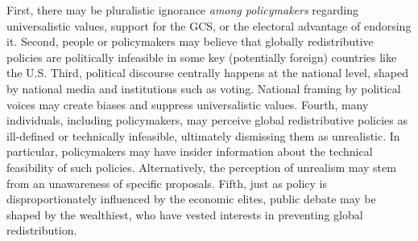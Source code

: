 First, there may be pluralistic ignorance \textit{among policymakers} regarding universalistic values, support for the GCS, or the electoral advantage of endorsing it. Second, people or policymakers may believe that globally redistributive policies are politically infeasible in some key (potentially foreign) countries like the U.S. %
Third, political discourse centrally happens at the national level, shaped by national media and institutions such as voting. 
National framing by political voices may create biases and suppress universalistic values. %
Fourth, many individuals, including policymakers, may perceive global redistributive policies as ill-defined or technically infeasible, ultimately dismissing them as unrealistic. In particular, policymakers may have insider information about the technical feasibility of such policies. Alternatively, the perception of unrealism may stem from an unawareness of specific proposals. %
Fifth, just as policy is disproportionately influenced by the economic elites,\citep{gilens_testing_2014,persson_rich_2023} public debate may be shaped by the wealthiest, who have vested interests in preventing global redistribution.

